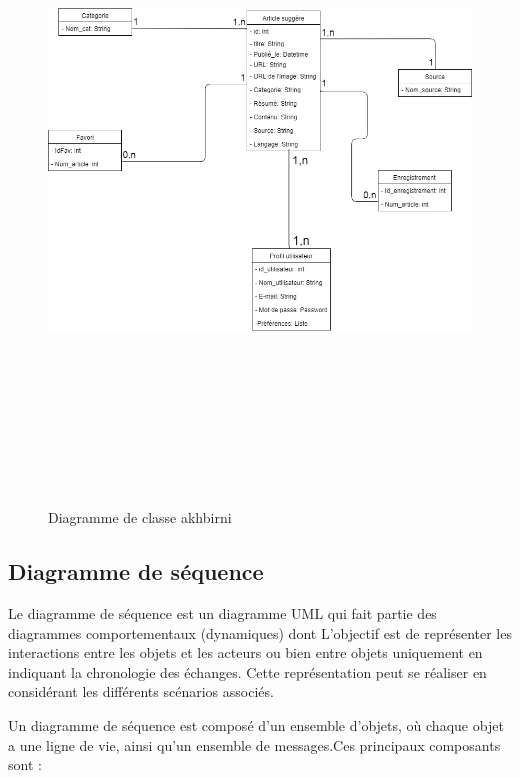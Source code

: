 \begin{figure}[H]
    \centering
    \includegraphics[height=500pt,width=400pt]{img/chapter3/ClassDiagram.jpg}
    \caption{Diagramme de classe akhbirni}
\end{figure}

\subsection{Diagramme de séquence}
Le diagramme de séquence est un diagramme UML qui fait partie des diagrammes comportementaux (dynamiques) dont L’objectif est de représenter les interactions entre les objets et les acteurs ou bien entre objets uniquement  en indiquant la chronologie des échanges. Cette représentation peut se réaliser en considérant les différents scénarios associés.

Un diagramme de séquence est composé d’un
ensemble d’objets, où chaque objet a une ligne de vie, ainsi qu’un ensemble de messages.Ces principaux composants sont :

